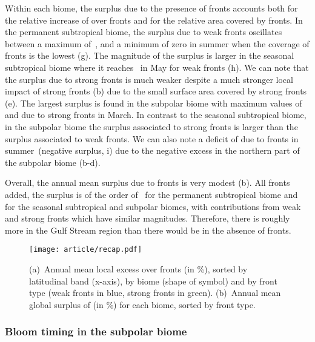 Within each biome, the surplus  due to the presence of fronts accounts both for the relative increase of  over fronts and for the relative area covered by fronts.
In the permanent subtropical biome, the surplus due to weak fronts oscillates between a maximum of~, and a minimum of zero in summer when the coverage of fronts is the lowest (g).
The magnitude of the surplus is larger in the seasonal subtropical biome where it reaches~ in May for weak fronts (h).
We can note that the surplus due to strong fronts is much weaker despite a much stronger local impact of strong fronts (b) due to the small surface area covered by strong fronts (e).
The largest surplus is found in the subpolar biome with maximum values of~ and due to strong fronts in March.
In contrast to the seasonal subtropical biome, in the subpolar biome the surplus associated to strong fronts is larger than the surplus associated to weak fronts.
We can also note a deficit of  due to fronts in summer~(negative surplus, i) due to the negative excess in the northern part of the subpolar biome (b-d).

Overall, the annual mean  surplus due to fronts is very modest (b).
All fronts added, the surplus is of the order of~ for the permanent subtropical biome and~ for the seasonal subtropical and subpolar biomes, with contributions from weak and strong fronts which have similar magnitudes.
Therefore, there is roughly~ more  in the Gulf Stream region than there would be in the absence of fronts.

\begin{figure}
  \centering
  \texttt{[image: article/recap.pdf]}
  \caption[Recap of local and global impact of fronts on ]{%
    (a)~Annual mean local   excess over fronts (in \%), sorted by latitudinal band (x-axis),  by biome (shape of symbol) and by front type (weak fronts in blue, strong fronts in green).
    (b)~Annual mean global surplus of  (in \%) for each biome, sorted by front type.
  }%
  \label{fig:recap}
\end{figure}


\subsubsection{Bloom timing in the subpolar biome}

